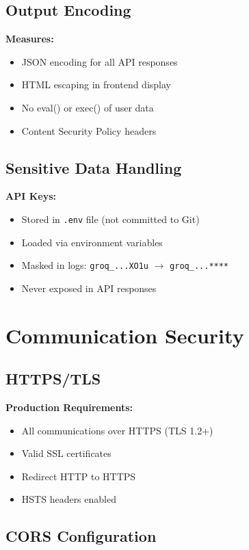 \documentclass[12pt,a4paper]{report}
\begin{document}
\subsection{Output Encoding}

\textbf{Measures:}
\begin{itemize}
    \item JSON encoding for all API responses
    \item HTML escaping in frontend display
    \item No eval() or exec() of user data
    \item Content Security Policy headers
\end{itemize}

\subsection{Sensitive Data Handling}

\textbf{API Keys:}
\begin{itemize}
    \item Stored in \texttt{.env} file (not committed to Git)
    \item Loaded via environment variables
    \item Masked in logs: \texttt{groq\_...XO1u} $\rightarrow$ \texttt{groq\_...****}
    \item Never exposed in API responses
\end{itemize}

\section{Communication Security}

\subsection{HTTPS/TLS}

\textbf{Production Requirements:}
\begin{itemize}
    \item All communications over HTTPS (TLS 1.2+)
    \item Valid SSL certificates
    \item Redirect HTTP to HTTPS
    \item HSTS headers enabled
\end{itemize}

\subsection{CORS Configuration}
\end{document}
